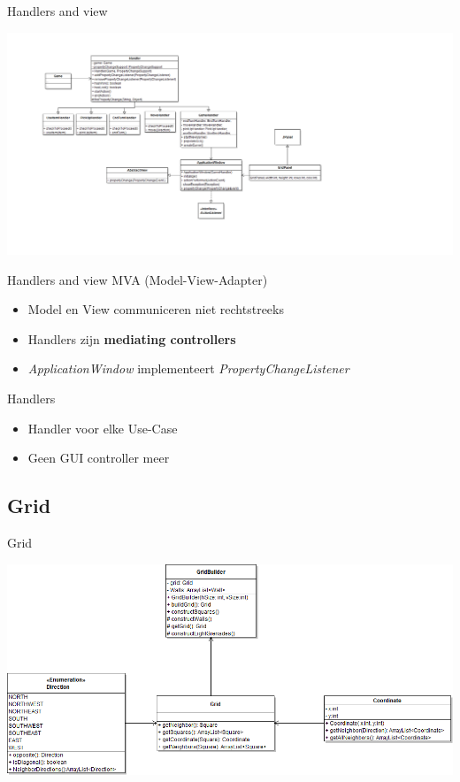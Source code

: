 \documentclass[t]{beamer}
\begin{document}
\begin{frame}{Handlers and view}
\begin{center}
\includegraphics[width=\linewidth]{images/Handlers-View}
\end{center}
\end{frame}


\begin{frame}{Handlers and view}
MVA (Model-View-Adapter) 
\begin{itemize}
	\item Model en View communiceren niet rechtstreeks
	\item Handlers zijn \textbf{mediating controllers}
	\item \textit{ApplicationWindow} implementeert \textit{PropertyChangeListener}
\end{itemize}
Handlers
\begin{itemize}
	\item Handler voor elke Use-Case
	\item Geen GUI controller meer
\end{itemize}
\end{frame}

\subsection{Grid}
\begin{frame}{Grid}
\begin{center}
\includegraphics[width=\linewidth]{images/GridClass}
\end{center}
\end{frame}
\end{document}
